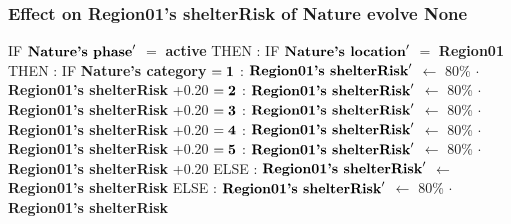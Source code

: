 \documentclass{article}%
\begin{document}
\subsubsection{Effect on Region01's shelterRisk of Nature evolve None}%
\label{ssubsec:Effect on Region01's shelterRisk of Nature evolve None}%
\begin{flushleft}%
IF %
$\mbox{\textbf{Nature's phase}} '$%
$=$%
\textbf{active}%
\linebreak%
\hspace*{2em}%
THEN %
: %
IF %
$\mbox{\textbf{Nature's location}} '$%
$=$%
\textbf{Region01}%
\linebreak%
\hspace*{4em}%
THEN %
: %
IF %
\textbf{Nature's category}%
\linebreak%
\hspace*{6em}%
$= \mbox{\textbf{1}}$%
: %
$\mbox{\textbf{Region01's shelterRisk}} '$%
$\leftarrow$%
80\%%
$\cdot$%
\textbf{Region01's shelterRisk}%
+0.20%
\linebreak%
\hspace*{6em}%
$= \mbox{\textbf{2}}$%
: %
$\mbox{\textbf{Region01's shelterRisk}} '$%
$\leftarrow$%
80\%%
$\cdot$%
\textbf{Region01's shelterRisk}%
+0.20%
\linebreak%
\hspace*{6em}%
$= \mbox{\textbf{3}}$%
: %
$\mbox{\textbf{Region01's shelterRisk}} '$%
$\leftarrow$%
80\%%
$\cdot$%
\textbf{Region01's shelterRisk}%
+0.20%
\linebreak%
\hspace*{6em}%
$= \mbox{\textbf{4}}$%
: %
$\mbox{\textbf{Region01's shelterRisk}} '$%
$\leftarrow$%
80\%%
$\cdot$%
\textbf{Region01's shelterRisk}%
+0.20%
\linebreak%
\hspace*{6em}%
$= \mbox{\textbf{5}}$%
: %
$\mbox{\textbf{Region01's shelterRisk}} '$%
$\leftarrow$%
80\%%
$\cdot$%
\textbf{Region01's shelterRisk}%
+0.20%
\linebreak%
\hspace*{4em}%
ELSE %
: %
$\mbox{\textbf{Region01's shelterRisk}} '$%
$\leftarrow$%
\textbf{Region01's shelterRisk}%
\linebreak%
\hspace*{2em}%
ELSE %
: %
$\mbox{\textbf{Region01's shelterRisk}} '$%
$\leftarrow$%
80\%%
$\cdot$%
\textbf{Region01's shelterRisk}%
\end{flushleft}

%
\end{document}
